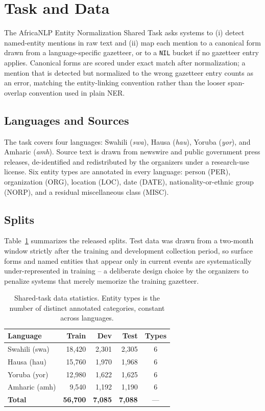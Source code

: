 \section{Task and Data}
\label{sec:task-data}

The AfricaNLP Entity Normalization Shared Task asks systems to (i) detect
named-entity mentions in raw text and (ii) map each mention to a canonical
form drawn from a language-specific gazetteer, or to a
\texttt{NIL} bucket if no gazetteer entry applies. Canonical forms are
scored under exact match after normalization; a mention that is detected
but normalized to the wrong gazetteer entry counts as an error, matching
the entity-linking convention rather than the looser span-overlap
convention used in plain NER.

\subsection{Languages and Sources}
The task covers four languages: Swahili (\textit{swa}), Hausa
(\textit{hau}), Yoruba (\textit{yor}), and Amharic (\textit{amh}). Source
text is drawn from newswire and public government press releases,
de-identified and redistributed by the organizers under a research-use
license. Six entity types are annotated in every language: person (PER),
organization (ORG), location (LOC), date (DATE), nationality-or-ethnic
group (NORP), and a residual miscellaneous class (MISC).

\subsection{Splits}
Table~\ref{tab:data} summarizes the released splits. Test data was drawn
from a two-month window strictly after the training and development
collection period, so surface forms and named entities that appear only in
current events are systematically under-represented in training --
a deliberate design choice by the organizers to penalize systems that
merely memorize the training gazetteer.

\begin{table}[t]
\centering
\small
\caption{Shared-task data statistics. Entity types is the number of
distinct annotated categories, constant across languages.}
\label{tab:data}
\begin{tabular}{@{}lrrrc@{}}
\toprule
\textbf{Language} & \textbf{Train} & \textbf{Dev} & \textbf{Test} & \textbf{Types} \\
\midrule
Swahili (swa) & 18{,}420 & 2{,}301 & 2{,}305 & 6 \\
Hausa (hau)   & 15{,}760 & 1{,}970 & 1{,}968 & 6 \\
Yoruba (yor)  & 12{,}980 & 1{,}622 & 1{,}625 & 6 \\
Amharic (amh) &  9{,}540 & 1{,}192 & 1{,}190 & 6 \\
\midrule
\textbf{Total} & \textbf{56{,}700} & \textbf{7{,}085} & \textbf{7{,}088} & --- \\
\bottomrule
\end{tabular}
\end{table}

